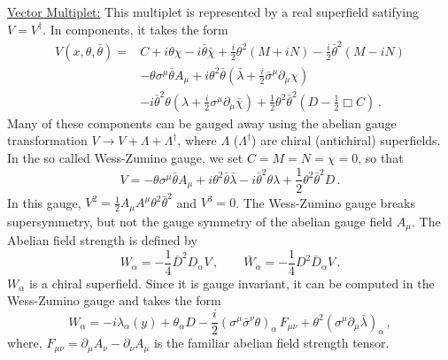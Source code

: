\noindent\underline{Vector Multiplet:} 
\noindent This multiplet is represented by a real superfield satifying
$V=V^\dagger$. In components, it takes the form
$$
\begin{array}{lll}
V(x, \theta, \bar{\theta}) =& C + i \theta  \chi - i \bar{\theta}
\bar{\chi} + \frac{i}{2} \theta^{2} (M + i N) - \frac{i}{2}
\bar{\theta}^{2} (M - iN) \\
& - \theta \sigma^\mu \bar{\theta} A_\mu + i \theta^{2} \bar{\theta}
(\bar{\lambda} + \frac{i}{2} \bar{\sigma}^\mu \partial_\mu \chi )\\
& - i \bar{\theta}^{2} \theta (\lambda + \frac{i}{2} \sigma^\mu
\partial_\mu \bar{\chi} ) + \frac{1}{2} \theta^{2} \bar{\theta}^{2}
(D - \frac{1}{2} \Box C)\,.
\end{array}
$$
Many of these components can be gauged away using the abelian gauge
transformation $V \rightarrow V + \Lambda + \Lambda^\dagger$, where  
$\Lambda$ ($\Lambda^\dagger$) are chiral (antichiral) superfields.  
In the so called Wess-Zumino gauge, we set $C=M=N=\chi= 0$, so that
$$
V=-\theta \sigma^\mu\bar{\theta}A_\mu+i\theta^{2}
\bar{\theta}\bar{\lambda} - i \bar{\theta}^{2} \theta \lambda +
\frac{1}{2} \theta^{2} \bar{\theta}^{2} D\,.
$$
In this gauge, $V^2=\frac{1}{2}A_\mu A^\mu \theta^{2}\bar{\theta}^{2}$
and $V^{3}=0$. The Wess-Zumino gauge breaks supersymmetry, but not the
gauge symmetry of the abelian gauge field $A_\mu$. The Abelian field
strength is defined by  
$$
W_{\alpha} = - \frac{1}{4} \bar{D}^{2} D_{\alpha} V\,,\qquad
\bar{W}_{\dot{\alpha}}=-\frac{1}{4}D^{2} \bar{D}_{\dot{\alpha}}V\,.
$$
$W_{\alpha}$ is a chiral superfield. Since it is gauge invariant, it
can be computed in the Wess-Zumino gauge and takes the form
\begin{equation}
W_\alpha =-i\lambda_\alpha (y)+\theta_\alpha D-\frac{i}{2} 
(\sigma^\mu\bar{\sigma}^\nu \theta)_\alpha \, F_{\mu\nu}+ 
\theta^2 (\sigma^\mu \partial_\mu \bar{\lambda} )_{\alpha}\,,
\label{W-abelian}
\end{equation}
where, $F_{\mu\nu}=\partial_\mu A_\nu -\partial_\nu A_\mu$ is the
familiar abelian field strength tensor. 

